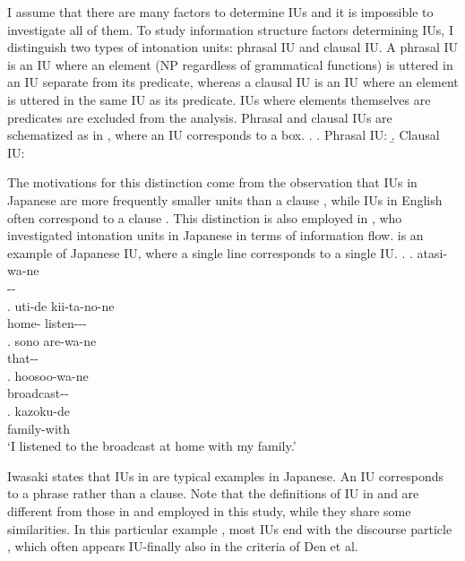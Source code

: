 I assume that there are many factors to determine IUs
and it is impossible to investigate all of them.
To study information structure factors determining IUs,
I distinguish two types of intonation units:
phrasal IU and clausal IU.
A phrasal IU is an IU where an element (NP regardless of grammatical functions) is uttered in an IU separate from its predicate, whereas
a clausal IU is an IU where an element is uttered in the same IU as its predicate.
IUs where elements themselves are predicates are excluded from the analysis.
Phrasal and clausal IUs are schematized as in \Next,
where an IU corresponds to a box.
%
\ex.
 \a. Phrasal IU:  
 \b. Clausal IU: 

The motivations for this distinction come from the observation that IUs in Japanese are more frequently smaller units than a clause \cite{iwasaki93},
while IUs in English often correspond to a clause \cite{chafe94}.
This distinction is also employed in ,
who investigated intonation units in Japanese in terms of information flow.
\Next is an example of Japanese IU,
where a single line corresponds to a single IU.
%
\ex.
 \ag. atasi-wa-ne \\
 		-- \\
 \bg. uti-de kii-ta-no-ne \\
 	home- listen--- \\
 \bg. sono are-wa-ne \\
 	 that-- \\
 \bg. hoosoo-wa-ne \\
 	broadcast--\\
 \bg. kazoku-de \\
 	family-with \\
	`I listened to the broadcast at home with my family.'
	\hfill{\cite[][p.~40]{iwasaki93}}

Iwasaki states that IUs in \Last are typical examples in Japanese.
An IU corresponds to a phrase rather than a clause.
Note that the definitions of IU in  and  are different from those in  and  employed in this study,
while they share some similarities.
In this particular example \Last,
most IUs end with the discourse particle ,
which often appears IU-finally also in the criteria of Den et al.


